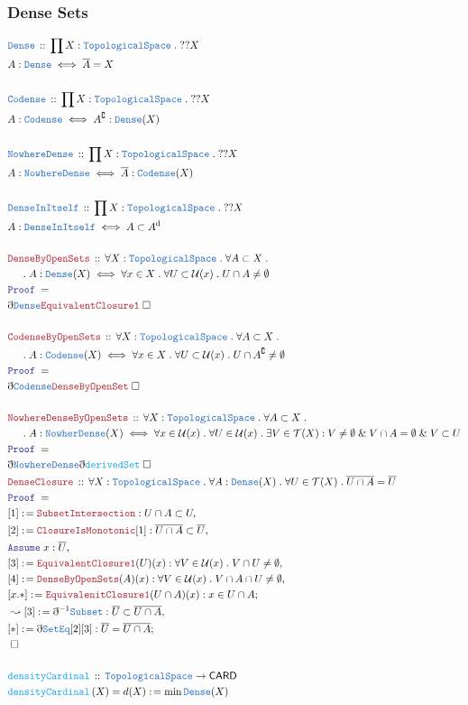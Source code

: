 \documentclass[12pt]{scrartcl}
\newcommand{\TYPE}[1]{\textcolor{NavyBlue}{\mathtt{#1}}}
\newcommand{\FUNC}[1]{\textcolor{Cerulean}{\mathtt{#1}}}
\newcommand{\LOGIC}[1]{\textcolor{Blue}{\mathtt{#1}}}
\newcommand{\THM}[1]{\textcolor{Maroon}{\mathtt{#1}}}
\renewcommand{\.}{\; . \;}
\newcommand{\de}{: \kern 0.1pc =}
\newcommand{\Act}[1]{\left( #1 \right)}
\newcommand{\Theorem}[2]{& \THM{#1} \, :: \, #2 \\ & \Proof = \\ }
\newcommand{\DeclareType}[2]{& \TYPE{#1} \, :: \, #2 \\}
\newcommand{\DefineType}[3]{& #1 : \TYPE{#2} \iff #3 \\}
\newcommand{\DeclareFunc}[2]{& \FUNC{#1} \, :: \, #2 \\}
\newcommand{\DefineNamedFunc}[4]{&  \FUNC{#1}\Act{#2} = #3 \de #4 \\}
\newcommand{\NewLine}{\\ & \kern 1pc}
\newcommand{\Page}[1]{ \begin{align*} #1 \end{align*}   }
\newcommand{ \bd }{ \ByDef }
\renewcommand{\And}{\; \& \;}
\renewcommand{\c}{\complement}
\newcommand{\Say}[3]{& #1 \de #2 : #3, \\}
\newcommand{\Conclude}[3]{& #1 \de #2 : #3; \\}
\newcommand{\Derive}[3]{& \leadsto #1 \de #2 : #3, \\}
\newcommand{\Assume}[2]{& \LOGIC{Assume} \; #1 : #2, \\}
\newcommand{\QED}{\; \square}
\newcommand{\EndProof}{& \QED \\}
\newcommand{\ByDef}{\eth}
\newcommand{\Proof}{\LOGIC{Proof} \; }
\newcommand{\TS}{\TYPE{TopologicalSpace}}
\newcommand{\T}{\mathcal{T}}
\renewcommand{\U}{\mathcal{U}}
\renewcommand{\d}{\mathrm{d}}
\begin{document}
\subsubsection{Dense Sets}
\Page{
	\DeclareType{Dense}{\prod X : \TS \. ??X}
	\DefineType{A}{Dense}{\overline{A} = X}
	\\
	\DeclareType{Codense}{\prod X : \TS \. ??X}
	\DefineType{A}{Codense}{A^\c : \TYPE{Dense}(X)}
	\\
	\DeclareType{NowhereDense}{\prod X : \TS \. ??X}
	\DefineType{A}{NowhereDense}{\overline{A} : \TYPE{Codense}(X)} 
	\\
	\DeclareType{DenseInItself}{\prod X : \TS \. ??X}
	\DefineType{A}{DenseInItself}{A \subset A^\d}
	\\
	\Theorem{DenseByOpenSets}
	{
		\forall X : \TS \. 
		\forall A \subset X \. \NewLine \. 
		A : \TYPE{Dense}(X) \iff \forall x \in X \. \forall U \subset \U(x) \. U \cap A \neq \emptyset
	}
	&  \bd \TYPE{Dense} \THM{EquivalentClosure1} \QED
	\\ \\
	\Theorem{CodenseByOpenSets}
	{
		\forall X : \TS \. 
		\forall A \subset X \. \NewLine \. 
		A : \TYPE{Codense}(X) \iff \forall x \in X \. \forall U \subset \U(x) 
		\. U \cap A^\c \neq \emptyset
	}
	&  \bd \TYPE{Codense} \THM{DenseByOpenSet} \QED
	\\ \\
	\Theorem{NowhereDenseByOpenSets}
	{
		\forall X : \TS \. 
		\forall A \subset X \. \NewLine \. 
		A : \TYPE{NowherDense}(X) \iff \forall x \in \U(x) \. 
		\forall U \in \U(x) \. 
		\exists V \in \T(X) :
		V \neq \emptyset \And V \cap A = \emptyset \And V \subset U
	}
	&  \bd \TYPE{NowhereDense} \bd \FUNC{derivedSet} \QED
	\\
	\Theorem{DenseClosure}
	{
		\forall X : \TS \.
		\forall A : \TYPE{Dense}(X) \.
		\forall U \in \T(X) \. 
		\overline{U \cap A} =  \overline{U}
	}
	\Say{[1]}{\THM{SubsetIntersection}}{U  \cap A \subset U}
	\Say{[2]}{\THM{ClosureIsMonotonic}[1]}{ \overline{U \cap A} \subset \overline{U}}
	\Assume{x}{\overline{U}}
	\Say{[3]}{\THM{EquivalentClosure1}(U)(x)}
	{\forall V \in \U(x) \. V \cap U \neq \emptyset }
	\Say{[4]}{\THM{DenseByOpenSets}(A)(x) }
	{\forall V \in \U(x) \. V \cap A \cap U \neq \emptyset }
	\Conclude{[x.*]}{\THM{EquivalenitClosure1}(U \cap A)(x)}
	{
		x \in U \cap A
	}
	\Derive{[3]}{\bd^{-1} \TYPE{Subset}}
	{
		\overline{U} \subset \overline{U \cap A}
	}
	\Conclude{[*]}{\bd \TYPE{SetEq}[2][3]}
	{
		\overline{U} = \overline{U \cap A}
	}
	\EndProof
	\\
	\DeclareFunc{densityCardinal}
	{
		\TS \to \mathsf{CARD} 
	}
	\DefineNamedFunc{densityCardinal}
	{X}{d(X)}{\min \TYPE{Dense}(X)}
}
\end{document}
